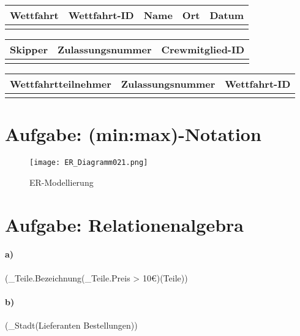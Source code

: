 \documentclass{article}
\begin{document}
\begin{table}[h!]
    \centering
    \begin{tabular}{|c|c|c|c|c|}
    \hline
         \bfseries\large{Wettfahrt} & Wettfahrt-ID & Name & Ort & Datum\\
         \hline
          & & & &  \\
    \hline
    \end{tabular}
    \label{tabelle01}
\end{table}


\begin{table}[h!]
    \centering
    \begin{tabular}{|c|c|c|}
    \hline
         \bfseries\large{Skipper} & Zulassungsnummer & Crewmitglied-ID\\
         \hline
          & & \\
    \hline
    \end{tabular}
    \label{tabelle01}
\end{table}


\begin{table}[h!]
    \centering
    \begin{tabular}{|c|c|c|}
    \hline
         \bfseries\large{Wettfahrtteilnehmer} & Zulassungsnummer & Wettfahrt-ID\\
         \hline
          & & \\
    \hline
    \end{tabular}
    \label{tabelle01}
\end{table}

\clearpage
\section{Aufgabe: (min:max)-Notation}
\begin{figure}[h]
    \centering
    \texttt{[image: ER\_Diagramm021.png]}
    \caption{ER-Modellierung}
    \label{Versuch01_Aufbau01}
\end{figure}

\section{Aufgabe: Relationenalgebra}
\paragraph{a)}
(\pi_{Teile.Bezeichnung}(\sigma_{Teile.Preis > 10€})(Teile))

\paragraph{b)} (\pi_{Stadt}(Lieferanten \cup Bestellungen))\\
\end{document}
